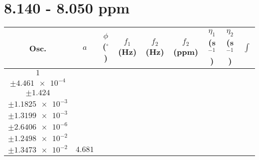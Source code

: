 \documentclass[8pt]{article}
\begin{document}
\section*{8.140 - 8.050 ppm}
\begin{longtable}[l]{c c c c c c c c c}
\toprule
Osc. & $a$ & $\phi$ ($^{\circ}$) & $f_1$ (Hz) & $f_2$ (Hz) & $f_2$ (ppm) & $\eta_1$ (s$^{-1}$) & $\eta_2$ (s$^{-1}$) & $\int$\\
\midrule
$\num{1}$ & \begin{tabular}[c]{@{}c@{}}$\num{2.2854e-2}$ \\ $\pm\num{4.461e-4}$\end{tabular} & \begin{tabular}[c]{@{}c@{}}$\num{0.2997}$ \\ $\pm\num{1.424}$\end{tabular} & \begin{tabular}[c]{@{}c@{}}$\num{-4.5587}$ \\ $\pm\num{1.1825e-3}$\end{tabular} & \begin{tabular}[c]{@{}c@{}}$\num{4.0404e+3}$ \\ $\pm\num{1.3199e-3}$\end{tabular} & \begin{tabular}[c]{@{}c@{}}$\num{8.0831}$ \\ $\pm\num{2.6406e-6}$\end{tabular} & \begin{tabular}[c]{@{}c@{}}$\num{0.67153}$ \\ $\pm\num{1.2498e-2}$\end{tabular} & \begin{tabular}[c]{@{}c@{}}$\num{0.57138}$ \\ $\pm\num{1.3473e-2}$\end{tabular} & $\num{4.681}$\\

\end{longtable}
\end{document}
